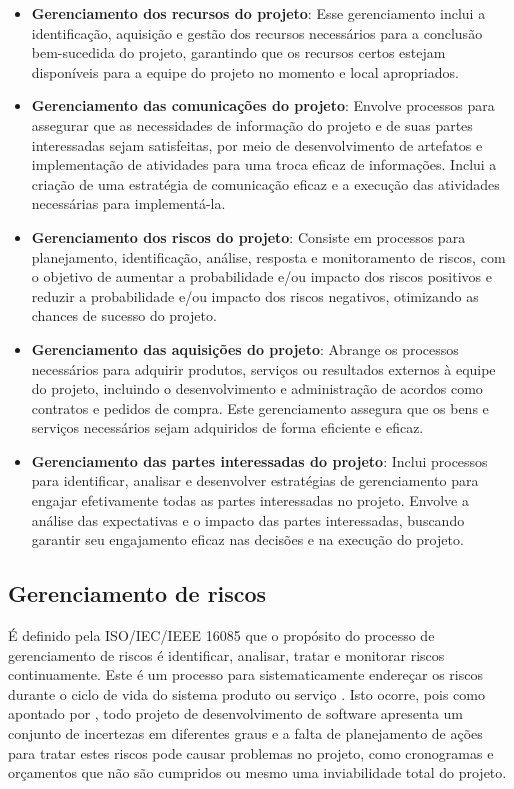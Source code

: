\documentclass[
	12pt,
	openright,
	twoside,
	a4paper,
	english,
	brazil
	]{abntex2}
\begin{document}
\begin{itemize}
  \item \textbf{Gerenciamento dos recursos do projeto}: Esse gerenciamento inclui a identificação, aquisição e gestão dos recursos necessários para a conclusão bem-sucedida do projeto, garantindo que os recursos certos estejam disponíveis para a equipe do projeto no momento e local apropriados.
  \item \textbf{Gerenciamento das comunicações do projeto}: Envolve processos para assegurar que as necessidades de informação do projeto e de suas partes interessadas sejam satisfeitas, por meio de desenvolvimento de artefatos e implementação de atividades para uma troca eficaz de informações. Inclui a criação de uma estratégia de comunicação eficaz e a execução das atividades necessárias para implementá-la.
  \item \textbf{Gerenciamento dos riscos do projeto}: Consiste em processos para planejamento, identificação, análise, resposta e monitoramento de riscos, com o objetivo de aumentar a probabilidade e/ou impacto dos riscos positivos e reduzir a probabilidade e/ou impacto dos riscos negativos, otimizando as chances de sucesso do projeto.
  \item \textbf{Gerenciamento das aquisições do projeto}: Abrange os processos necessários para adquirir produtos, serviços ou resultados externos à equipe do projeto, incluindo o desenvolvimento e administração de acordos como contratos e pedidos de compra. Este gerenciamento assegura que os bens e serviços necessários sejam adquiridos de forma eficiente e eficaz.
  \item \textbf{Gerenciamento das partes interessadas do projeto}: Inclui processos para identificar, analisar e desenvolver estratégias de gerenciamento para engajar efetivamente todas as partes interessadas no projeto. Envolve a análise das expectativas e o impacto das partes interessadas, buscando garantir seu engajamento eficaz nas decisões e na execução do projeto.
\end{itemize}


\subsection{Gerenciamento de riscos}

É definido pela ISO/IEC/IEEE 16085 que o propósito do processo de gerenciamento de riscos é identificar, analisar, tratar e monitorar riscos continuamente. Este é um processo para sistematicamente endereçar os riscos durante o ciclo de vida do sistema produto ou serviço \cite{iso16085}. Isto ocorre, pois como apontado por , todo projeto de desenvolvimento de software apresenta um conjunto de incertezas em diferentes graus e a falta de planejamento de ações para tratar estes riscos pode causar problemas no projeto, como cronogramas e orçamentos que não são cumpridos ou mesmo uma inviabilidade total do projeto.
\end{document}
